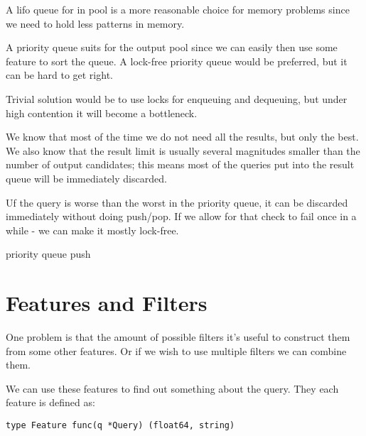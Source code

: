 A lifo queue for in pool is a more reasonable choice for memory problems 
since we need to hold less patterns in memory.

A priority queue suits for the output pool since we can easily then use some feature to sort 
the queue. A lock-free priority queue would be preferred, but it can be hard to get right. 

Trivial solution would be to use locks for enqueuing and dequeuing, but under high contention it
will become a bottleneck.

We know that most of the time we do not need all the results, but only the best. 
We also know that the result limit is usually several magnitudes smaller than the 
number of output candidates; this means most of the queries put into the result 
queue will be immediately discarded.

Uf the query is worse than the worst in the priority queue, it can be 
discarded immediately without doing push/pop. If we allow for that check
to fail once in a while - we can make it mostly lock-free.

\begin{algorithm}[H]
    \caption{priority queue push}
\begin{algorithmic}[1]   
        
        \Return
    \EndIf

    \EndIf
\end{algorithmic}
\end{algorithm}

\section{Features and Filters}

One problem is that the amount of possible filters it's useful to construct them from some other features. 
Or if we wish to use multiple filters we can combine them.

We can use these features to find out something about the query.
They each feature is defined as:

\begin{verbatim}
type Feature func(q *Query) (float64, string)
\end{verbatim}

